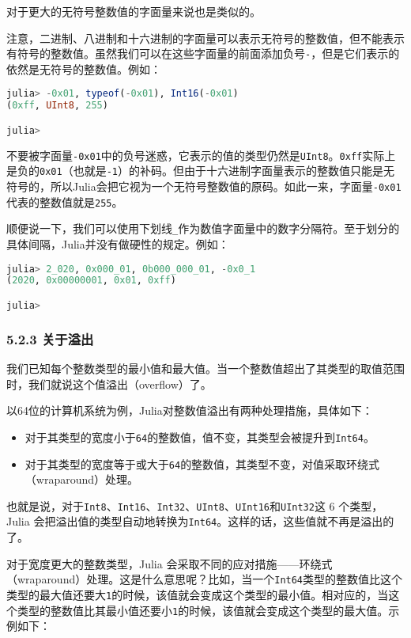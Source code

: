 对于更大的无符号整数值的字面量来说也是类似的。

注意，二进制、八进制和十六进制的字面量可以表示无符号的整数值，但不能表示有符号的整数值。虽然我们可以在这些字面量的前面添加负号\verb|-|，但是它们表示的依然是无符号的整数值。例如：

\begin{lstlisting}[language=julia]
julia> -0x01, typeof(-0x01), Int16(-0x01)
(0xff, UInt8, 255)

julia> 
\end{lstlisting}

不要被字面量\verb|-0x01|中的负号迷惑，它表示的值的类型仍然是\verb|UInt8|。\verb|0xff|实际上是负的\verb|0x01|（也就是\verb|-1|）的补码。但由于十六进制字面量表示的整数值只能是无符号的，所以Julia会把它视为一个无符号整数值的原码。如此一来，字面量\verb|-0x01|代表的整数值就是\verb|255|。

顺便说一下，我们可以使用下划线\verb|_|作为数值字面量中的数字分隔符。至于划分的具体间隔，Julia并没有做硬性的规定。例如：

\begin{lstlisting}[language=julia]
julia> 2_020, 0x000_01, 0b000_000_01, -0x0_1
(2020, 0x00000001, 0x01, 0xff)

julia> 
\end{lstlisting}

\subsubsection{5.2.3 关于溢出}

我们已知每个整数类型的最小值和最大值。当一个整数值超出了其类型的取值范围时，我们就说这个值溢出（overflow）了。

以64位的计算机系统为例，Julia对整数值溢出有两种处理措施，具体如下：

\begin{itemize}
\item 对于其类型的宽度小于\verb|64|的整数值，值不变，其类型会被提升到\verb|Int64|。
\item  对于其类型的宽度等于或大于\verb|64|的整数值，其类型不变，对值采取环绕式（wraparound）处理。
\end{itemize}

也就是说，对于\verb|Int8|、\verb|Int16|、\verb|Int32|、\verb|UInt8|、\verb|UInt16|和\verb|UInt32|这 6 个类型，Julia 会把溢出值的类型自动地转换为\verb|Int64|。这样的话，这些值就不再是溢出的了。

对于宽度更大的整数类型，Julia 会采取不同的应对措施——环绕式（wraparound）处理。这是什么意思呢？比如，当一个\verb|Int64|类型的整数值比这个类型的最大值还要大\verb|1|的时候，该值就会变成这个类型的最小值。相对应的，当这个类型的整数值比其最小值还要小\verb|1|的时候，该值就会变成这个类型的最大值。示例如下：

